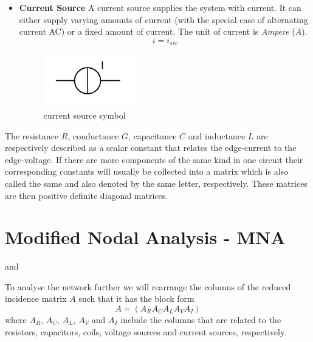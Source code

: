 \begin{itemize}
	\item \textbf{Current Source} \newline
	A current source supplies the system with current. It can either supply varying amounts of current (with the special case of alternating current AC) or a fixed amount of current. The unit of current is \emph{Ampere} ($A$).
	\begin{equation}
		\label{eq:current source law}
		i = i_{src}
	\end{equation}
	\begin{figure}[H]
		\label{fig:current source symbol}
		\centering
		\includegraphics[width=4cm]{pictures/current_source.png}
		\caption{current source symbol}
	\end{figure}
\end{itemize}

The resistance $R$, conductance $G$, capacitance $C$ and inductance $L$ are respectively described as a scalar constant that relates the edge-current to the edge-voltage. If there are more components of the same kind in one circuit their corresponding constants will usually be collected into a matrix which is also called the same and also denoted by the same letter, respectively. These matrices are then positive definite diagonal matrices.

\section{Modified Nodal Analysis - MNA}
\label{sec:MNA}


\cite{ModellingAndDiscretizationOfCircuitProblems} and \cite{NumerikGewöhnlicherDifferentialgleichungen}

To analyse the network further we will rearrange the columns of the reduced incidence matrix $A$ such that it has the block form
\begin{displaymath}
	A = (A_R A_C A_L A_V A_I)
\end{displaymath}
where $A_R$, $A_C$, $A_L$, $A_V$ and $A_I$ include the columns that are related to the resistors, capacitors, coils, voltage sources and current sources, respectively.


